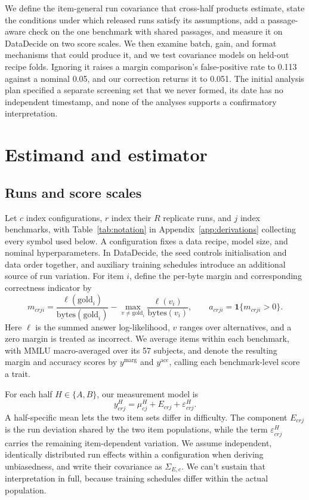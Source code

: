 \documentclass{article}
\begin{document}
We define the item-general run covariance that cross-half products estimate, state the conditions under which released runs satisfy its assumptions, add a passage-aware check on the one benchmark with shared passages, and measure it on DataDecide on two score scales. We then examine batch, gain, and format mechanisms that could produce it, and we test covariance models on held-out recipe folds. Ignoring it raises a margin comparison's false-positive rate to 0.113 against a nominal 0.05, and our correction returns it to 0.051. The initial analysis plan specified a separate screening set that we never formed, its date has no independent timestamp, and none of the analyses supports a confirmatory interpretation.

\section{Estimand and estimator}
\label{sec:estimator}
\subsection{Runs and score scales}
Let $c$ index configurations, $r$ index their $R$ replicate runs, and $j$ index benchmarks, with Table~\ref{tab:notation} in Appendix~\ref{app:derivations} collecting every symbol used below. A configuration fixes a data recipe, model size, and nominal hyperparameters. In DataDecide, the seed controls initialisation and data order together, and auxiliary training schedules introduce an additional source of run variation. For item $i$, define the per-byte margin and corresponding correctness indicator by
\begin{equation}
m_{crji}=\frac{\ell(\mathrm{gold}_i)}{\mathrm{bytes}(\mathrm{gold}_i)}-
\max_{v\ne\mathrm{gold}_i}\frac{\ell(v_i)}{\mathrm{bytes}(v_i)},
\qquad a_{crji}=\mathbf{1}\{m_{crji}>0\}.
\label{eq:scores}
\end{equation}
Here $\ell$ is the summed answer log-likelihood, $v$ ranges over alternatives, and a zero margin is treated as incorrect. We average items within each benchmark, with MMLU macro-averaged over its 57 subjects, and denote the resulting margin and accuracy scores by $y^{\mathrm{marg}}$ and $y^{\mathrm{acc}}$, calling each benchmark-level score a trait.

For each half $H\in\{A,B\}$, our measurement model is
\begin{equation}
y^H_{crj}=\mu^H_{cj}+E_{crj}+\varepsilon^H_{crj}.
\end{equation}
A half-specific mean lets the two item sets differ in difficulty. The component $E_{crj}$ is the run deviation shared by the two item populations, while the term $\varepsilon^H_{crj}$ carries the remaining item-dependent variation. We assume independent, identically distributed run effects within a configuration when deriving unbiasedness, and write their covariance as $\Sigma_{E,c}$. We can't sustain that interpretation in full, because training schedules differ within the actual population.
\end{document}
